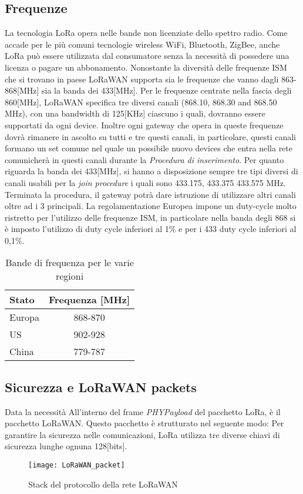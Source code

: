 \subsection{Frequenze}
La tecnologia LoRa opera nelle bande non licenziate dello spettro radio.  Come
accade per le più comuni tecnologie wireless WiFi, Bluetooth, ZigBee, anche LoRa
può essere utilizzata dal consumatore senza la necessità di possedere una
licenza o pagare un abbonamento.  Nonostante la diversità delle frequenze ISM
che si trovano in paese LoRaWAN supporta sia le frequenze che vanno dagli
863-868[MHz] sia la banda dei 433[MHz]. Per le frequenze centrate nella fascia
degli 860[MHz], LoRaWAN specifica tre diversi canali (868.10, 868.30 and 868.50
MHz), con una bandwidth di 125[KHz] ciascuno i quali, dovranno essere supportati
da ogni device. Inoltre ogni gateway che opera in queste frequenze dovrà
rimanere in ascolto su tutti e tre questi canali, in particolare, questi canali
formano un set comune nel quale un possibile nuovo devices che entra nella rete
comunicherà in questi canali durante la \emph{Procedura di inserimento}. Per
quanto riguarda la banda dei 433[MHz], si hanno a disposizione sempre tre tipi
diversi di canali usabili per la \emph{join procedure} i quali sono 433.175, 
433.375  433.575 MHz. Terminata la procedura, il gateway potrà dare istruzione
di utilizzare altri canali oltre ad i 3 principali.
La regolamentazione Europea impone un duty-cycle molto ristretto per l'utilizzo
delle frequenze ISM, in particolare nella banda degli 868 si è imposto
l'utilizzo di duty cycle inferiori al 1\% e per i 433 duty cycle inferiori al
0,1\%.
\begin{table}[h]
        \centering
        \begin{tabular}{l|c}
                \toprule
                Stato   & Frequenza [MHz] \\
                \hline
                Europa  & 868-870 \\
                US      & 902-928 \\
                China   & 779-787 \\
                \bottomrule
        \end{tabular}
        \caption{Bande di frequenza per le varie regioni}
\end{table}

\subsection{Sicurezza e LoRaWAN packets}
Data la necessità 
All'interno del frame \emph{PHYPayload} del pacchetto LoRa,  è il pacchetto
LoRaWAN. Questo pacchetto è strutturato nel seguente modo:
Per garantire la sicurezza nelle comunicazioni, LoRa utilizza tre diverse chiavi
di sicurezza lunghe ognuna 128[bits].
\begin{figure}[h]
\centering 
\texttt{[image: LoRaWAN\_packet]}
\caption{Stack del protocollo della rete LoRaWAN}
\label{fig:stack_lora}
\end{figure}

